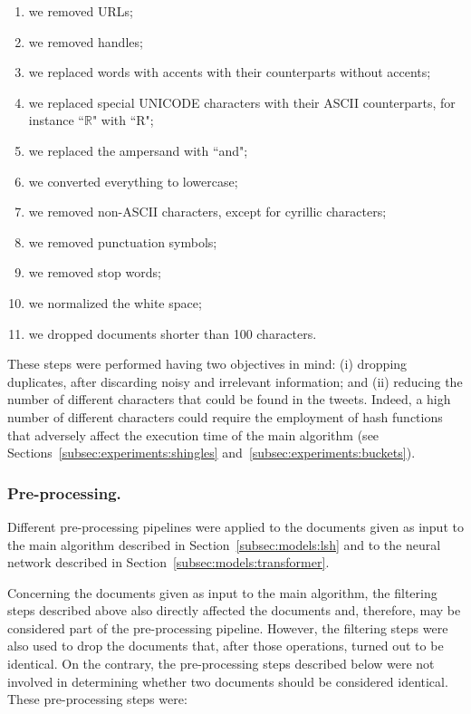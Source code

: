 \documentclass[runningheads]{llncs}
\begin{document}
\begin{enumerate}
  \item we removed URLs;
  \item we removed handles;
  \item we replaced words with accents with their counterparts without accents;
  \item we replaced special UNICODE characters with their ASCII counterparts, for instance “$\mathbb{R}$" with “R";
  \item we replaced the ampersand with “and";
  \item we converted everything to lowercase;
  \item we removed non-ASCII characters, except for cyrillic characters;
  \item we removed punctuation symbols;
  \item we removed stop words;
  \item we normalized the white space;
  \item we dropped documents shorter than 100 characters.
\end{enumerate}

These steps were performed having two objectives in mind: (i) dropping duplicates, after discarding noisy and irrelevant information; and (ii) reducing the number of different characters that could be found in the tweets. Indeed, a high number of different characters could require the employment of hash functions that adversely affect the execution time of the main algorithm (see Sections~\ref{subsec:experiments:shingles} and~\ref{subsec:experiments:buckets}).
 
\subsubsection{Pre-processing.} Different pre-processing pipelines were applied to the documents given as input to the main algorithm described in Section~\ref{subsec:models:lsh} and to the neural network described in Section~\ref{subsec:models:transformer}.

Concerning the documents given as input to the main algorithm, the filtering steps described above also directly affected the documents and, therefore, may be considered part of the pre-processing pipeline. However, the filtering steps were also used to drop the documents that, after those operations, turned out to be identical. On the contrary, the pre-processing steps described below were not involved in determining whether two documents should be considered identical. These pre-processing steps were:
\end{document}
